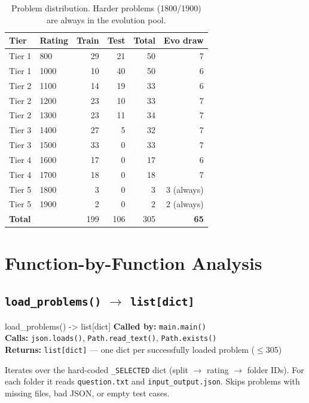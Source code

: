 \documentclass[11pt,a4paper]{report}
\newcommand{\fn}[1]{\texttt{#1}}
\begin{document}
\begin{table}[h]
\centering
\begin{tabular}{@{}llrrrr@{}}
\toprule
\textbf{Tier} & \textbf{Rating} & \textbf{Train} & \textbf{Test} & \textbf{Total} & \textbf{Evo draw} \\
\midrule
Tier 1 & 800  & 29 & 21 & 50 & 7 \\
Tier 1 & 1000 & 10 & 40 & 50 & 6 \\
Tier 2 & 1100 & 14 & 19 & 33 & 6 \\
Tier 2 & 1200 & 23 & 10 & 33 & 7 \\
Tier 2 & 1300 & 23 & 11 & 34 & 7 \\
Tier 3 & 1400 & 27 &  5 & 32 & 7 \\
Tier 3 & 1500 & 33 &  0 & 33 & 7 \\
Tier 4 & 1600 & 17 &  0 & 17 & 6 \\
Tier 4 & 1700 & 18 &  0 & 18 & 7 \\
Tier 5 & 1800 &  3 &  0 &  3 & 3 (always) \\
Tier 5 & 1900 &  2 &  0 &  2 & 2 (always) \\
\midrule
\textbf{Total} & & 199 & 106 & 305 & \textbf{65} \\
\bottomrule
\end{tabular}
\caption{Problem distribution. Harder problems (1800/1900) are always in the evolution pool.}
\end{table}

\section{Function-by-Function Analysis}

\subsection{\fn{load\_problems()} $\to$ \fn{list[dict]}}

\begin{specbox}{load\_problems() -> list[dict]}
\textbf{Called by:} \fn{main.main()}\\
\textbf{Calls:} \fn{json.loads()}, \fn{Path.read\_text()}, \fn{Path.exists()}\\
\textbf{Returns:} \texttt{list[dict]} --- one dict per successfully loaded problem ($\leq$305)
\end{specbox}

Iterates over the hard-coded \fn{\_SELECTED} dict (split $\to$ rating $\to$ folder IDs).
For each folder it reads \fn{question.txt} and \fn{input\_output.json}.  Skips problems
with missing files, bad JSON, or empty test cases.
\end{document}
